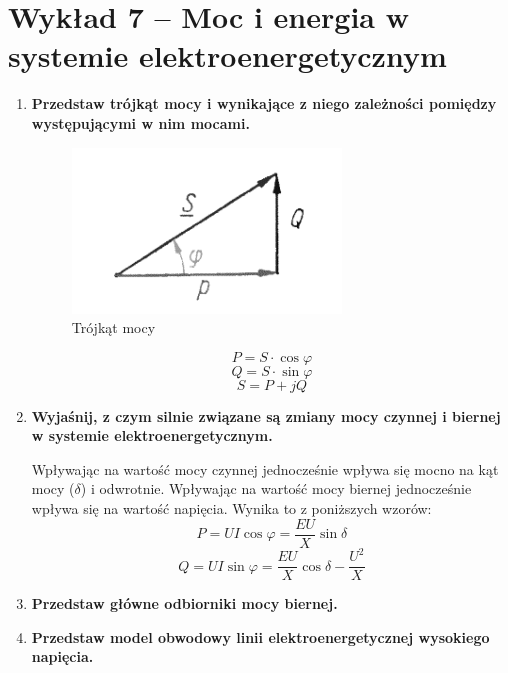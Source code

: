 \documentclass[12pt]{article}
\newcommand{\pytanie}[1]{\item \textbf{#1}}
\begin{document}
\section{Wykład 7 -- Moc i energia w systemie elektroenergetycznym}
	\begin{enumerate}
	    \pytanie{Przedstaw trójkąt mocy i wynikające z niego zależności pomiędzy występującymi w nim mocami.}
	
	        \begin{figure}[H]
	            \centering
	            \includegraphics[width=0.3\linewidth]{images/wyklad7_1.png}
	            \caption*{Trójkąt mocy}
	        \end{figure}
	        \begin{equation*}
	            P = S \cdot \cos\varphi
	        \end{equation*}
	        \begin{equation*}
	            Q = S \cdot \sin\varphi
	        \end{equation*}
	        \begin{equation*}
	            S = P + jQ
	        \end{equation*}
	
	    \pytanie{Wyjaśnij, z czym silnie związane są zmiany mocy czynnej i biernej w systemie 
	    elektroenergetycznym.}
	
	        Wpływając na wartość mocy czynnej jednocześnie wpływa się mocno na kąt mocy ($\delta$) i odwrotnie.
	        Wpływając na wartość mocy biernej jednocześnie wpływa się na wartość napięcia.
	        Wynika to z poniższych wzorów:
	        \begin{equation*}
	            P = U I \cos\varphi = \frac{E U}{X} \sin\delta
	        \end{equation*}
	        \begin{equation*}
	            Q = U I \sin\varphi = \frac{E U}{X} \cos\delta - \frac{U^2}{X}
	        \end{equation*}
	
	    \pytanie{Przedstaw główne odbiorniki mocy biernej.}
	
	        
	
	    \pytanie{Przedstaw model obwodowy linii elektroenergetycznej wysokiego napięcia.}
	

\end{enumerate}
\end{document}
